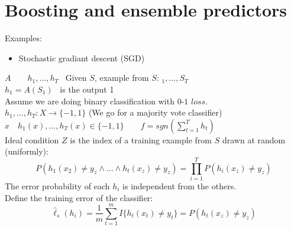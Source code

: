 \documentclass[../main.tex]{subfiles}
\begin{document}
\section{Boosting and ensemble predictors }
Examples:
\begin{itemize}
\item Stochastic gradiant descent (SGD)
\end{itemize}
$A \qquad h_1, ..., h_T$ \ Given $S$, example from $S$: $_1,...,S_T$
\\
$h_1 = A(S_1)$ \ is the output 1
\\
Assume we are doing binary classification with $0$-$1$ $loss$.
\\
$
h_1,...,h_T : X \rightarrow \{-1,1\}
$ \qquad (We go for a majority vote classifier)
\\
$
x \quad h_1(x),...,h_T(x) \in \{-1,1\} \qquad f = sgn \left( \sum_{t=1}^T h_t \right)
$
\\
Ideal condition $Z$ is the index of a training example from $S$ drawn at random (uniformly):
$$
P \left(h_1(x_2) \neq y_z \wedge ... \wedge h_t(x_z) \neq y_z \right) = \prod_{i=1}^T P\left(h_i(x_z) \neq y_z \right)
$$
The error probability of each $h_i$ is independent from the others.
\\
Define the training error of the classifier:
$$
\hat{\ell}_s(h_i) = \frac{1}{m} \sum_{t=1}^m I \{h_t(x_t) \neq y_t \} = P \left(h_t(x_z) \neq y_z \right)
$$
\end{document}
